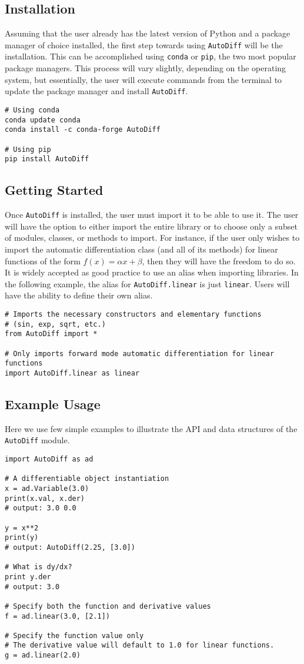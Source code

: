 \subsection{Installation}
Assuming that the user already has the latest version of Python and a package
manager of choice installed, the first step towards using \texttt{AutoDiff} will
be the installation. This can be accomplished using \texttt{conda} or
\texttt{pip}, the two most popular package managers. This process will vary
slightly, depending on the operating system, but essentially, the user will
execute commands from the terminal to update the package manager and install
\texttt{AutoDiff}. 
\begin{verbatim}
# Using conda
conda update conda
conda install -c conda-forge AutoDiff

# Using pip
pip install AutoDiff
\end{verbatim}
\subsection{Getting Started}
Once \texttt{AutoDiff} is installed, the user must import it to be able to use it.
The user will have the option to either import the entire library or to choose
only a subset of modules, classes, or methods to import. For instance, if the user
only wishes to import the automatic differentiation class (and all of its methods)
for linear functions of the form $f(x) = \alpha x + \beta$, then they will have
the freedom to do so. It is widely accepted as good practice to use an alias when
importing libraries. In the following example, the alias for
\texttt{AutoDiff.linear} is just \texttt{linear}. Users will have the ability to
define their own alias.
\begin{verbatim}
# Imports the necessary constructors and elementary functions 
# (sin, exp, sqrt, etc.) 
from AutoDiff import *

# Only imports forward mode automatic differentiation for linear functions
import AutoDiff.linear as linear
\end{verbatim}
 

\subsection{Example Usage}
Here we use few simple examples to illustrate the API and data structures of the 
\texttt{AutoDiff} module.
\begin{verbatim}  
import AutoDiff as ad

# A differentiable object instantiation
x = ad.Variable(3.0)
print(x.val, x.der)
# output: 3.0 0.0

y = x**2
print(y)
# output: AutoDiff(2.25, [3.0])

# What is dy/dx?
print y.der
# output: 3.0

# Specify both the function and derivative values
f = ad.linear(3.0, [2.1])

# Specify the function value only
# The derivative value will default to 1.0 for linear functions.
g = ad.linear(2.0)
\end{verbatim}

